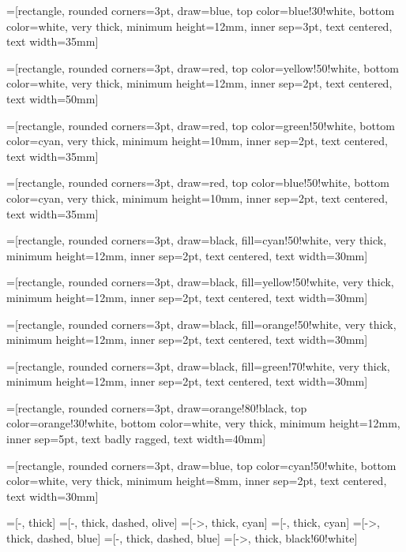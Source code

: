 %
%

=[rectangle, rounded corners=3pt, draw=blue, top color=blue!30!white, bottom
color=white, very thick, minimum height=12mm, inner sep=3pt, text centered, text width=35mm]

=[rectangle, rounded corners=3pt, draw=red, top color=yellow!50!white, bottom
color=white, very thick, minimum height=12mm, inner sep=2pt, text centered, text width=50mm]

=[rectangle, rounded corners=3pt, draw=red, top color=green!50!white, bottom
color=cyan, very thick, minimum height=10mm, inner sep=2pt, text centered, text width=35mm]

=[rectangle, rounded corners=3pt, draw=red, top color=blue!50!white, bottom
color=cyan, very thick, minimum height=10mm, inner sep=2pt, text centered, text width=35mm]

=[rectangle, rounded corners=3pt, draw=black, fill=cyan!50!white, 
 very thick, minimum height=12mm, inner sep=2pt,  text centered, text width=30mm]

=[rectangle, rounded corners=3pt, draw=black, fill=yellow!50!white, 
 very thick, minimum height=12mm, inner sep=2pt,  text centered, text width=30mm]

=[rectangle, rounded corners=3pt, draw=black, fill=orange!50!white, 
 very thick, minimum height=12mm, inner sep=2pt,  text centered, text width=30mm]

=[rectangle, rounded corners=3pt, draw=black, fill=green!70!white, 
 very thick, minimum height=12mm, inner sep=2pt,  text centered, text width=30mm]

=[rectangle, rounded corners=3pt, draw=orange!80!black, top color=orange!30!white,
bottom color=white, very thick, minimum height=12mm, inner sep=5pt, text badly ragged, text width=40mm]

=[rectangle, rounded corners=3pt, draw=blue, top color=cyan!50!white, bottom
color=white, very thick, minimum height=8mm, inner sep=2pt, text centered, text width=30mm]

=[-, thick]
=[-, thick, dashed, olive]
=[->, thick, cyan]
=[-, thick, cyan]
=[->, thick, dashed, blue]
=[-, thick, dashed, blue]
=[->, thick,  black!60!white]

